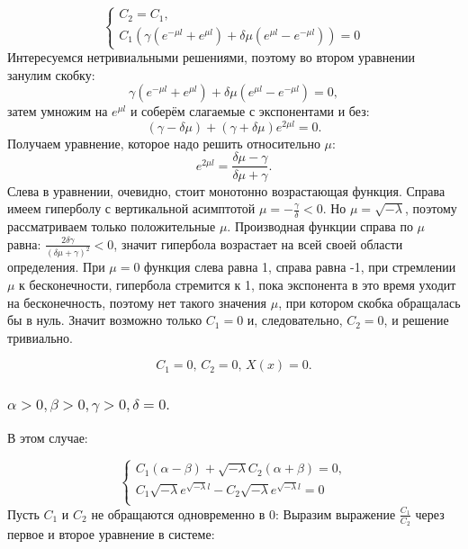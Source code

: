 \documentclass[12pt, a4paper]{report}
\begin{document}
\begin{displaymath}
	\begin{cases}
		C_{2} = C_{1}, \\
		C_{1} (\gamma (e^{-\mu l} + e^{\mu l}) + \delta \mu (e^{\mu l} - e^{-\mu l})) = 0
	\end{cases}
\end{displaymath}
Интересуемся нетривиальными решениями, поэтому во втором уравнении занулим скобку:
\[ \gamma (e^{-\mu l} + e^{\mu l}) + \delta \mu (e^{\mu l} - e^{-\mu l}) = 0, \]
затем умножим на $ e^{\mu l}$ и соберём слагаемые с экспонентами и без:
\[ (\gamma - \delta \mu) + (\gamma + \delta \mu) e^{2 \mu l} = 0. \]
Получаем уравнение, которое надо решить относительно $\mu$:
\[ e^{2 \mu l} = \frac{\delta \mu - \gamma}{\delta \mu + \gamma}. \]
Слева в уравнении, очевидно, стоит монотонно возрастающая функция. Справа имеем гиперболу с вертикальной асимптотой $\mu = -\frac{\gamma}{\delta} < 0$. Но $\mu = \sqrt{-\lambda}$, поэтому рассматриваем только положительные $\mu$. Производная функции справа по $\mu$ равна: $\frac{2\delta \gamma}{(\delta \mu + \gamma)^2} < 0$, значит гипербола возрастает на всей своей области определения. При $\mu = 0$ функция слева равна 1, справа равна -1, при стремлении $\mu$ к бесконечности, гипербола стремится к 1, пока экспонента в это время уходит на бесконечность, поэтому нет такого значения $\mu$, при котором скобка обращалась бы в нуль. Значит возможно только $C_{1} = 0$ и, следовательно, $C_{2} = 0$, и решение тривиально.

\[ C_{1} = 0, \, C_{2} = 0, \, X(x) = 0. \]

\subsubsection{ $ \alpha > 0, \beta > 0, \gamma > 0, \delta = 0. $}

В этом случае:

\begin{equation*}
 \begin{cases}
 C_1(\alpha -\beta)+\sqrt{-\lambda} C_2(\alpha+\beta) =0, 
   \\
C_1\sqrt{-\lambda} e^{\sqrt{-\lambda}l}-C_2\sqrt{-\lambda} e^{\sqrt{-\lambda}l}=0
   \\  
 \end{cases}
\end{equation*}
Пусть $C_1$ и $C_2$ не обращаются одновременно в 0:
Выразим выражение $\frac{C_1}{C_2}$ через первое и второе уравнение в системе:
\end{document}
